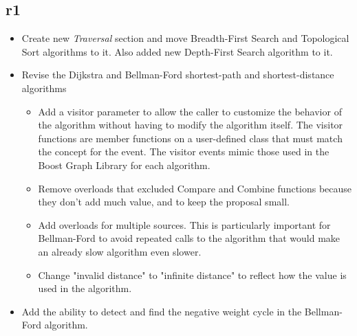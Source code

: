 \subsection*{\paperno r1}
\begin{itemize}
      \item Create new \textit{Traversal} section and move Breadth-First Search and Topological Sort algorithms to it.
            Also added new Depth-First Search algorithm to it.
      \item Revise the Dijkstra and Bellman-Ford shortest-path and shortest-distance algorithms
            \begin{itemize}
                  \item Add a visitor parameter to allow the caller to
                        customize the behavior of the algorithm without having to modify the algorithm itself.
                        The visitor functions are member functions on a user-defined class that must match the concept for the event.
                        The visitor events mimic those used in the Boost Graph Library for each algorithm.
                  \item Remove overloads that excluded Compare and Combine functions because they don't add much value,
                        and to keep the proposal small.
                  \item Add overloads for multiple sources. This is particularly important for Bellman-Ford to avoid
                        repeated calls to the algorithm that would make an already slow algorithm even slower.
                  \item Change "invalid distance" to "infinite distance" to reflect how the value is used 
                        in the algorithm.
            \end{itemize}
      \item Add the ability to detect and find the negative weight cycle in the Bellman-Ford algorithm.
\end{itemize}
